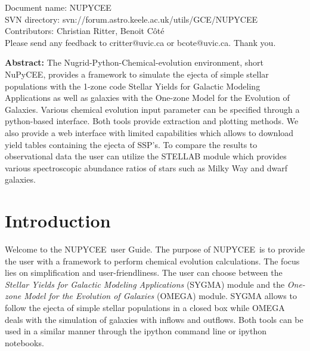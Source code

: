 \renewcommand{\ndoctitle}{NUPYCEE} 
\renewcommand{\ndocname}{NUPYCEE}                      
\renewcommand{\svndir}{svn://forum.astro.keele.ac.uk/utils/GCE/NUPYCEE}  
\renewcommand{\ndoccontribs}{Christian Ritter, Benoit C\^ot\'e}

%

Document name: \ndocname \\
SVN directory: \svndir\\
Contributors: \ndoccontribs\\
Please send any feedback to critter@uvic.ca or bcote@uvic.ca. Thank you.


{  \textbf{Abstract:} %
\noindent The Nugrid-Python-Chemical-evolution environment, short NuPyCEE, provides
a framework to simulate the ejecta of simple stellar populations with the 1-zone code
Stellar Yields for Galactic Modeling Applications as well as galaxies
with the One-zone Model for the Evolution of Galaxies.
Various chemical evolution input parameter can be specified through a python-based interface.
Both tools provide extraction and plotting methods.
We also provide a web interface with limited capabilities which allows to download
yield tables containing the ejecta of SSP's. 
To compare the results to observational data the user can utilize the STELLAB module
which provides various spectroscopic abundance ratios of stars such as
Milky Way and dwarf galaxies.
}



\section{Introduction}
\index{\ndocname}
Welcome to the \ndocname\ user Guide. The purpose of \ndocname\ is to 
provide the user with a framework to perform chemical evolution calculations.
The focus lies on simplification and user-friendliness.
The user can choose between the \textit{Stellar Yields for Galactic Modeling Applications} (SYGMA) module 
and the \textit{One-zone Model for the Evolution of Galaxies} (OMEGA) module.
SYGMA allows to follow the ejecta of simple stellar populations in a closed box while OMEGA deals with
the simulation of galaxies with inflows and outflows.
Both tools can be used in a similar manner through the ipython command line or
ipython notebooks.

